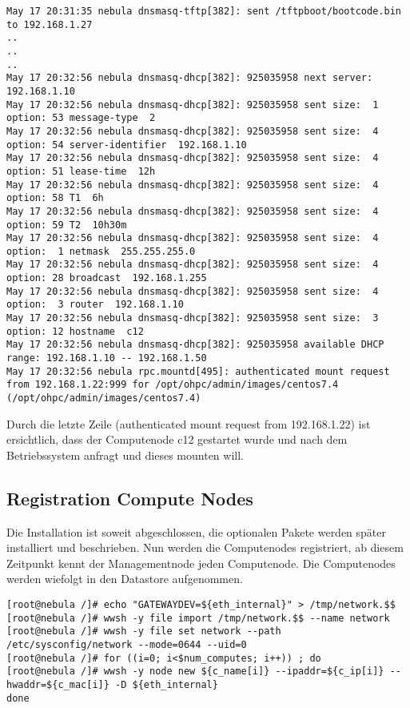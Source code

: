 \begin{lstlisting}
May 17 20:31:35 nebula dnsmasq-tftp[382]: sent /tftpboot/bootcode.bin to 192.168.1.27
..
..
..
May 17 20:32:56 nebula dnsmasq-dhcp[382]: 925035958 next server: 192.168.1.10
May 17 20:32:56 nebula dnsmasq-dhcp[382]: 925035958 sent size:  1 option: 53 message-type  2
May 17 20:32:56 nebula dnsmasq-dhcp[382]: 925035958 sent size:  4 option: 54 server-identifier  192.168.1.10
May 17 20:32:56 nebula dnsmasq-dhcp[382]: 925035958 sent size:  4 option: 51 lease-time  12h
May 17 20:32:56 nebula dnsmasq-dhcp[382]: 925035958 sent size:  4 option: 58 T1  6h
May 17 20:32:56 nebula dnsmasq-dhcp[382]: 925035958 sent size:  4 option: 59 T2  10h30m
May 17 20:32:56 nebula dnsmasq-dhcp[382]: 925035958 sent size:  4 option:  1 netmask  255.255.255.0
May 17 20:32:56 nebula dnsmasq-dhcp[382]: 925035958 sent size:  4 option: 28 broadcast  192.168.1.255
May 17 20:32:56 nebula dnsmasq-dhcp[382]: 925035958 sent size:  4 option:  3 router  192.168.1.10
May 17 20:32:56 nebula dnsmasq-dhcp[382]: 925035958 sent size:  3 option: 12 hostname  c12
May 17 20:32:56 nebula dnsmasq-dhcp[382]: 925035958 available DHCP range: 192.168.1.10 -- 192.168.1.50
May 17 20:32:56 nebula rpc.mountd[495]: authenticated mount request from 192.168.1.22:999 for /opt/ohpc/admin/images/centos7.4 (/opt/ohpc/admin/images/centos7.4)
\end{lstlisting}

Durch die letzte Zeile (authenticated mount request from 192.168.1.22) ist ersichtlich, dass der Computenode c12 gestartet wurde und nach dem Betriebssystem anfragt und dieses mounten will.

\subsection{Registration Compute Nodes}

Die Installation ist soweit abgeschlossen, die optionalen Pakete werden später installiert und beschrieben. Nun werden die Computenodes registriert, ab diesem Zeitpunkt kennt der Managementnode jeden Computenode. Die Computenodes werden wiefolgt in den Datastore aufgenommen.

\begin{lstlisting}
[root@nebula /]# echo "GATEWAYDEV=${eth_internal}" > /tmp/network.$$
[root@nebula /]# wwsh -y file import /tmp/network.$$ --name network
[root@nebula /]# wwsh -y file set network --path /etc/sysconfig/network --mode=0644 --uid=0
[root@nebula /]# for ((i=0; i<$num_computes; i++)) ; do
[root@nebula /]# wwsh -y node new ${c_name[i]} --ipaddr=${c_ip[i]} --hwaddr=${c_mac[i]} -D ${eth_internal}
done
\end{lstlisting}
\newpage
